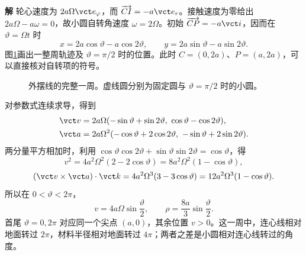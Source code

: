 \documentclass[11pt,openany,fontset=fandol]{ctexbook}
\theoremstyle{definition}\newtheorem{example}{例}[chapter]\newtheorem{exercise}{习题}[chapter]
\newcommand{\SolutionStart}{\par\medskip\ifdim\pagetotal>0pt\ifdim\dimexpr\pagegoal-\pagetotal\relax<3\baselineskip\newpage\fi\fi\noindent\textbf{解}\quad\ignorespaces}
\newenvironment{solution}{\SolutionStart}{\par\medskip}
\begin{document}
\begin{solution}
轮心速度为 $2a\Omega\vct e_\varphi$，而 $\overrightarrow{CI}=-a\vct e_r$。接触速度为零给出
$2a\Omega-a\omega=0$，故小圆自转角速度 $\omega=2\Omega$。初始 $\overrightarrow{CP}=-a\vct i$，因而在 $\vartheta=\Omega t$ 时
\[
x=2a\cos\vartheta-a\cos2\vartheta,\qquad
y=2a\sin\vartheta-a\sin2\vartheta.
\]
图\ref{mp3:fig:l3-p5-s}画出一整周轨迹及 $\vartheta=\pi/2$ 时的位置。此时 $C=(0,2a)$、$P=(a,2a)$，可以直接核对自转项的符号。

\begin{figure}[H]\centering
{}
\caption{外摆线的完整一周。虚线圆分别为固定圆与 $\vartheta=\pi/2$ 时的小圆。}\label{mp3:fig:l3-p5-s}
\end{figure}


对参数式连续求导，得到
\[
\begin{aligned}
\vct v&=2a\Omega(-\sin\vartheta+\sin2\vartheta,\ \cos\vartheta-\cos2\vartheta),\\
\vct a&=2a\Omega^2(-\cos\vartheta+2\cos2\vartheta,\ {-\sin\vartheta}+2\sin2\vartheta).
\end{aligned}
\]
两分量平方相加时，利用 $\cos\vartheta\cos2\vartheta+\sin\vartheta\sin2\vartheta=\cos\vartheta$，得
\[
v^2=4a^2\Omega^2(2-2\cos\vartheta)=8a^2\Omega^2(1-\cos\vartheta),
\]
\[
(\vct v\times\vct a)\cdot\vct k
=4a^2\Omega^3(3-3\cos\vartheta)
=12a^2\Omega^3(1-\cos\vartheta).
\]
所以在 $0<\vartheta<2\pi$，
\[
v=4a\Omega\sin\frac\vartheta2,\qquad
\rho=\frac{8a}{3}\sin\frac\vartheta2.
\]
首尾 $\vartheta=0,2\pi$ 对应同一个尖点 $(a,0)$，其余位置 $v>0$。这一周中，连心线相对地面转过 $2\pi$，材料半径相对地面转过 $4\pi$；两者之差是小圆相对连心线转过的角度。

\end{solution}
\end{document}
